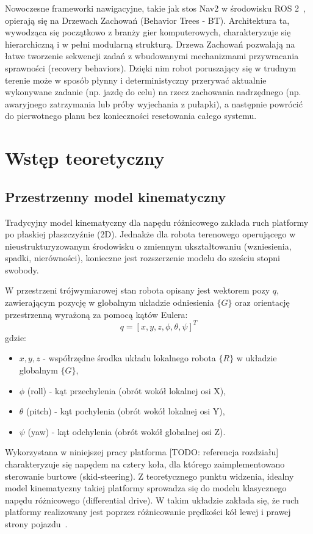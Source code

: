\documentclass[a4paper,twoside,12pt]{book}
\begin{document}
Nowoczesne frameworki nawigacyjne, takie jak stos Nav2 w środowisku ROS 2~\cite{macenski2020marathon2}, opierają się na Drzewach Zachowań (Behavior Trees - BT). Architektura ta, wywodząca się początkowo z branży gier komputerowych, charakteryzuje się hierarchiczną i w pełni modularną strukturą. Drzewa Zachowań pozwalają na łatwe tworzenie sekwencji zadań z wbudowanymi mechanizmami przywracania sprawności (recovery behaviors). Dzięki nim robot poruszający się w trudnym terenie może w sposób płynny i deterministyczny przerywać aktualnie wykonywane zadanie (np. jazdę do celu) na rzecz zachowania nadrzędnego (np. awaryjnego zatrzymania lub próby wyjechania z pułapki), a następnie powrócić do pierwotnego planu bez konieczności resetowania całego systemu.


\chapter{Wstęp teoretyczny}
\section{Przestrzenny model kinematyczny}
Tradycyjny model kinematyczny dla napędu różnicowego zakłada ruch platformy po płaskiej płaszczyźnie (2D). Jednakże dla robota terenowego operującego w nieustrukturyzowanym środowisku o zmiennym ukształtowaniu (wzniesienia, spadki, nierówności), konieczne jest rozszerzenie modelu do sześciu stopni swobody.

W przestrzeni trójwymiarowej stan robota opisany jest wektorem pozy $q$, zawierającym pozycję w globalnym układzie odniesienia $\{G\}$ oraz orientację przestrzenną wyrażoną za pomocą kątów Eulera:
\[q = [x, y, z, \phi, \theta, \psi]^T\]
gdzie:
\begin{itemize}
    \item $x, y, z$ - współrzędne środka układu lokalnego robota $\{R\}$ w układzie globalnym $\{G\}$,
    \item $\phi$ (roll) - kąt przechylenia (obrót wokół lokalnej osi X),
    \item $\theta$ (pitch) - kąt pochylenia (obrót wokół lokalnej osi Y),
    \item $\psi$ (yaw) - kąt odchylenia (obrót wokół globalnej osi Z).
\end{itemize}

Wykorzystana w niniejszej pracy platforma [TODO: referencja rozdziału] charakteryzuje się napędem na cztery koła, dla którego zaimplementowano sterowanie burtowe (skid-steering). Z teoretycznego punktu widzenia, idealny model kinematyczny takiej platformy sprowadza się do modelu klasycznego napędu różnicowego (differential drive). W takim układzie zakłada się, że ruch platformy realizowany jest poprzez różnicowanie prędkości kół lewej i prawej strony pojazdu~\cite{dudek2008inertial}.
\end{document}
